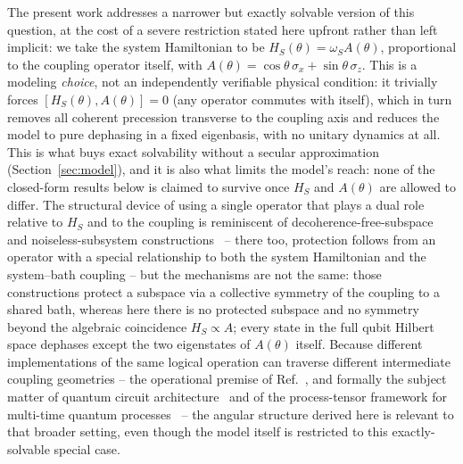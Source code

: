 \documentclass[aps,pra,reprint,superscriptaddress,nofootinbib,longbibliography]{revtex4-2}
\begin{document}
The present work addresses a narrower but exactly solvable version of
this question, at the cost of a severe restriction stated here upfront
rather than left implicit: we take the system Hamiltonian to be
$H_S(\theta)=\omega_S A(\theta)$, proportional to the coupling operator
itself, with
$A(\theta)=\cos\theta\,\sigma_x+\sin\theta\,\sigma_z$. This is a
modeling \emph{choice}, not an independently verifiable physical
condition: it trivially forces $[H_S(\theta),A(\theta)]=0$ (any
operator commutes with itself), which in turn removes all coherent
precession transverse to the coupling axis and reduces the model to
pure dephasing in a fixed eigenbasis, with no unitary dynamics at all.
This is what buys exact solvability without a secular approximation
(Section~\ref{sec:model}), and it is also what limits the model's
reach: none of the closed-form results below is claimed to survive
once $H_S$ and $A(\theta)$ are allowed to differ. The structural
device of using a single operator that plays a dual role relative to
$H_S$ and to the coupling is reminiscent of decoherence-free-subspace
and noiseless-subsystem
constructions~\cite{zanardi1997noiseless} -- there too, protection
follows from an operator with a special relationship to both the
system Hamiltonian and the system--bath coupling -- but the mechanisms
are not the same: those constructions protect a subspace via a
collective symmetry of the coupling to a shared bath, whereas here
there is no protected subspace and no symmetry beyond the algebraic
coincidence $H_S\propto A$; every state in the full qubit Hilbert
space dephases except the two eigenstates of $A(\theta)$ itself.
Because different implementations of the same logical operation can
traverse different intermediate coupling geometries -- the operational
premise of Ref.~\cite{rodrigues2025}, and formally the subject matter
of quantum circuit architecture~\cite{chiribella2008quantum} and of
the process-tensor framework for multi-time quantum
processes~\cite{pollock2018nonmarkovian,milz2021quantum} -- the
angular structure derived here is relevant to that broader setting,
even though the model itself is restricted to this exactly-solvable
special case.
\end{document}
